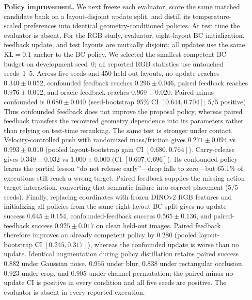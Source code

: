 \documentclass[conference]{IEEEtran}
\begin{document}
\textbf{Policy improvement.}
We next freeze each evaluator, score the same matched candidate bank on a
layout-disjoint update split, and distill its temperature-scaled preferences
into identical geometry-conditioned policies. At test time the evaluator is
absent. For the RGB study, evaluator, eight-layout BC initialization, feedback
update, and test layouts are mutually disjoint; all updates use the same
$\mathrm{KL}{=}0.1$ anchor to the BC policy. We selected the smallest competent
BC budget on development seed~0; all reported RGB statistics use untouched
seeds~1--5. Across five seeds and 450 held-out layouts, no update reaches
$0.340{\pm}0.052$, confounded feedback reaches $0.296{\pm}0.046$, paired
feedback reaches $0.976{\pm}0.012$, and oracle feedback reaches
$0.969{\pm}0.020$. Paired minus confounded is $0.680{\pm}0.040$ (seed-bootstrap
95\% CI $[0.644,0.704]$; 5/5 positive). Thus confounded feedback does not improve
the proposal policy, whereas paired feedback transfers the recovered geometry
dependence into its parameters rather than relying on test-time reranking.
The same test is stronger under contact. Velocity-controlled push with randomized
mass/friction gives $0.271{\pm}0.094$ vs $0.993{\pm}0.010$ (pooled layout-bootstrap
gain CI $[0.680,0.764]$). Carry-release gives $0.349{\pm}0.032$ vs
$1.000{\pm}0.000$ (CI $[0.607,0.696]$). Its confounded policy learns the partial
lesson ``do not release early''---drop falls to zero---but $65.1\%$ of executions
still reach a wrong target. Paired feedback supplies the missing action--target
interaction, converting that semantic failure into correct placement (5/5 seeds).
Finally, replacing coordinates with frozen DINOv2 RGB features and initializing
all policies from the same eight-layout BC split gives no-update success
$0.645{\pm}0.154$, confounded-feedback success $0.565{\pm}0.136$, and
paired-feedback success $0.925{\pm}0.017$ on clean held-out images. Paired
feedback therefore improves an already competent policy by $0.280$ (pooled
layout-bootstrap CI $[0.245,0.317]$), whereas the confounded update is worse
than no update. Identical augmentation during policy distillation retains
paired success $0.882$ under Gaussian noise, $0.955$ under blur, $0.838$ under
rectangular occlusion, $0.923$ under crop, and $0.905$ under channel
permutation; the paired-minus-no-update CI is positive in every condition and
all five seeds are positive. The evaluator is absent in every reported
execution.
\end{document}
